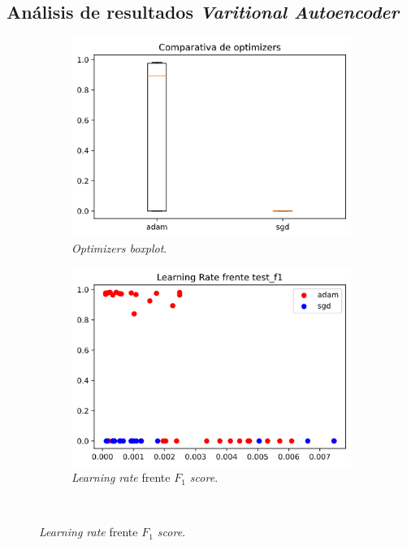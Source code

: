 \subsection{Análisis de resultados \textit{Varitional Autoencoder}}

\begin{figure}[H]
\begin{subfigure}[b]{.5\textwidth}
  \centering
  \includegraphics[width=.8\linewidth]{imagenes/06_Experimentacion/vae/vaeboxplot.png}
  \caption{\textit{Optimizers boxplot}.}
  \label{fig:vaeoptimizers}
\end{subfigure}
\begin{subfigure}[b]{.5\textwidth}
  \centering
  \includegraphics[width=.8\linewidth]{imagenes/06_Experimentacion/vae/vaelr.png}
  \caption{\textit{Learning rate} frente \textit{$F_1$ score}.}
  \label{fig:vaelr}
\end{subfigure}\\


\end{figure}
